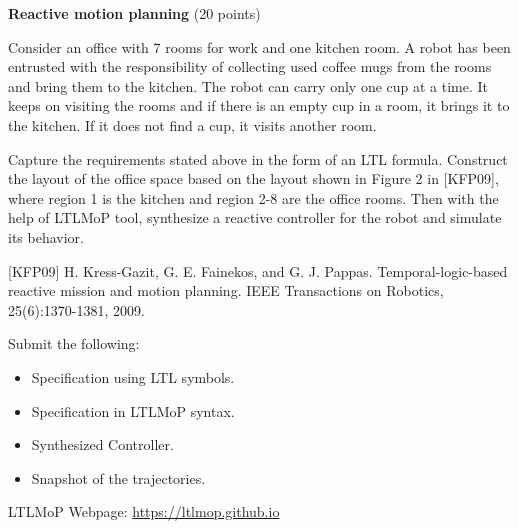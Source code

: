 \documentclass[a4paper, 12pt]{article}
\begin{document}
\newpage
\begin{problem} {\textbf{Reactive motion planning}} (20 points)

\bigskip
Consider an office with 7 rooms for work and one kitchen room. A robot has been entrusted with 
the responsibility of collecting used coffee mugs from the rooms and bring them to the kitchen.
The robot can carry only one cup at a time. It keeps on visiting the rooms and if there is an empty cup in a room,
it brings it to the kitchen. If it does not find a cup, it visits another room.

Capture the requirements stated above in the form of an LTL formula. 
Construct the layout of the office space based on the layout shown in Figure 2 in [KFP09],
where region 1 is the kitchen and region 2-8 are the office rooms.
Then with the help of LTLMoP tool, synthesize a reactive controller for the robot and simulate its behavior.

[KFP09] H. Kress-Gazit, G. E. Fainekos, and G. J. Pappas. Temporal-logic-based reactive mission and motion planning. IEEE Transactions on Robotics, 25(6):1370-1381, 2009. 

\bigskip
\noindent
Submit the following:
\begin{itemize}
\item Specification using LTL symbols.
\item Specification in LTLMoP syntax.
\item Synthesized Controller.
\item Snapshot of the trajectories.
\end{itemize}

\bigskip
\noindent
LTLMoP Webpage:
\url{https://ltlmop.github.io}

\newpage
\ \\
\begin{minipage}{1\textwidth}
		\rectangle{\linewidth}{24cm}
\end{minipage}
\newpage
\ \\
\begin{minipage}{1\textwidth}
		\rectangle{\linewidth}{24cm}
\end{minipage}
\newpage
\ \\
\begin{minipage}{1\textwidth}
		\rectangle{\linewidth}{24cm}
\end{minipage}
\newpage
\ \\
\begin{minipage}{1\textwidth}
		\rectangle{\linewidth}{24cm}
\end{minipage}
\newpage
\ \\
\begin{minipage}{1\textwidth}
		\rectangle{\linewidth}{24cm}
\end{minipage}
\newpage
\ \\
\begin{minipage}{1\textwidth}
		\rectangle{\linewidth}{24cm}
\end{minipage}
\end{problem}
\end{document}
